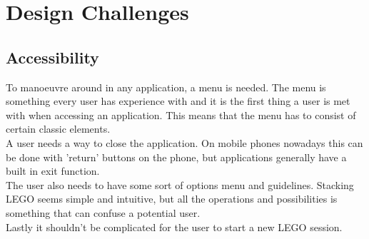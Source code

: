 
\section{Design Challenges}
\subsection{Accessibility}
To manoeuvre around in any application, a menu is needed. The menu is something every user has experience with and it is the first thing a user is met with when accessing an application. This means that the menu has to consist of certain classic elements.\\ A user needs a way to close the application. On mobile phones nowadays this can be done with 'return' buttons on the phone, but applications generally have a built in exit function.\\
The user also needs to have some sort of options menu and guidelines. Stacking LEGO seems simple and intuitive, but all the operations and possibilities is something that can confuse a potential user. \\
Lastly it shouldn't be complicated for the user to start a new LEGO session.
